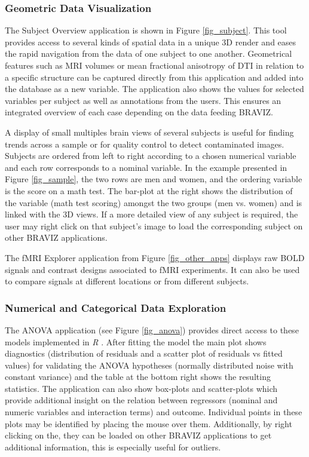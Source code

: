 \documentclass[twocolumn]{svjour3} %
\begin{document}
\subsubsection{Geometric Data Visualization}

The Subject Overview application is shown in Figure \ref{fig_subject}. This tool  provides access to several kinds of spatial data in a unique 3D render and eases the rapid navigation from the data of one subject to one another. Geometrical features such as MRI volumes or mean fractional anisotropy of DTI in relation to a specific structure can be captured directly from this application and added into the database as a new variable. The application also shows the values for selected variables per subject as well as annotations from the users. This ensures an integrated overview of each case depending on the data feeding BRAVIZ.

A display of small multiples \cite{tufte_visual_1983}  brain views  of several subjects is useful for finding trends across a sample or for quality control to detect contaminated images. Subjects are ordered from left to right according to a chosen numerical variable and each row corresponds to a nominal variable. In the example presented in Figure \ref{fig_sample}, the two rows are men and women, and the ordering variable is the score on a math test. The bar-plot at the right shows the distribution of the variable (math test scoring) amongst the two groups (men vs. women) and is linked with the 3D views. If a more detailed view of any subject is required, the user may right click on that subject’s image to load the corresponding subject on other BRAVIZ applications.

The fMRI Explorer application from Figure \ref{fig_other_apps} displays raw BOLD signals and contrast designs associated to fMRI experiments. It can also be used to compare signals at different locations or from different subjects.

\subsubsection{Numerical and Categorical Data Exploration}

The ANOVA application (see Figure \ref{fig_anova}) provides direct access to these models implemented in \emph{R} \cite{team_r:_2012}. After fitting the model the main plot shows diagnostics (distribution of residuals and a scatter plot of residuals vs fitted values) for validating the ANOVA hypotheses (normally distributed noise with constant variance) and the table at the bottom right shows the resulting statistics. The application can also show box-plots and scatter-plots which provide additional insight on the relation between regressors (nominal and numeric variables and interaction terms) and outcome. Individual points in these plots may be identified by placing the mouse over them. Additionally, by right clicking on the, they can be loaded on other BRAVIZ applications to get additional information, this is especially useful for outliers.
\end{document}
